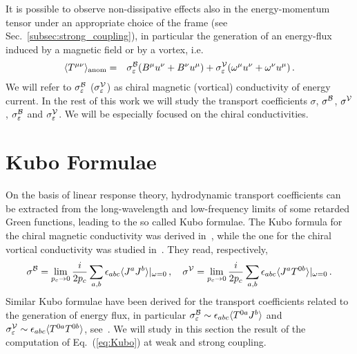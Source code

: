 \documentclass[a4paper]{jpconf}
\begin{document}
It is possible to observe non-dissipative effects also in the energy-momentum tensor under an appropriate choice of the frame (see Sec.~\ref{subsec:strong_coupling}), in particular the generation of an energy-flux induced by a magnetic field or by a vortex, i.e.
\begin{eqnarray}
\langle T^{\mu\nu} \rangle_{\textrm{\scriptsize anom}} &=& \sigma_{\varepsilon}^{{\cal B}} (B^\mu u^\nu + B^\nu u^\mu)  + \sigma_{\varepsilon}^{{\cal V}} (\omega^\mu u^\nu +  \omega^\nu u^\mu) \,. \label{eq:Tanom}
\end{eqnarray}
We will refer to $\sigma_{\varepsilon}^{{\cal B}}$ ($\sigma_{\varepsilon}^{{\cal V}}$) as chiral magnetic (vortical) conductivity of energy current. In the rest of this work we will study the transport coefficients $\sigma$, $\sigma^{\cal B}$, $\sigma^{\cal V}$, $\sigma_{\varepsilon}^{{\cal B}}$ and $\sigma_{\varepsilon}^{{\cal V}}$. We will be especially focused on the chiral conductivities.



\section{Kubo Formulae}
\label{sec:Kubo_Formulae}

On the basis of linear response theory, hydrodynamic transport coefficients can be extracted from the long-wavelength and low-frequency limits of some retarded Green functions, leading to the so called Kubo formulae. The Kubo formula for the chiral magnetic conductivity was derived in~\cite{Kharzeev:2009pj}, while the one for the chiral vortical conductivity was studied in~\cite{Amado:2011zx}. They read, respectively, 
\begin{equation}
\sigma^{\cal B} = \lim_{p_c\rightarrow 0} \frac{i}{2p_c} \sum_{a,b}\epsilon_{abc}
\langle J^a J^b \rangle|_{\omega=0}  \,,\quad \sigma^{\cal V}  = \lim_{p_c\rightarrow 0} \frac{i}{2p_c} \sum_{a,b}\epsilon_{abc}
\langle J^a T^{0b} \rangle|_{\omega=0} \,.  \label{eq:Kubo}
\end{equation}
Similar Kubo formulae have been derived for the transport coefficients related to the generation of energy flux, in particular $\sigma_{\varepsilon}^{{\cal B}} \sim \epsilon_{abc} \langle T^{0a} J^b \rangle$ and $\sigma_{\varepsilon}^{{\cal V}} \sim \epsilon_{abc} \langle T^{0a} T^{0b} \rangle$, see~\cite{Amado:2011zx,Landsteiner:2011iq,Landsteiner:2012kd,Chowdhury:2015pba}. We will study in this section the result of the computation of Eq.~(\ref{eq:Kubo}) at weak and strong coupling.
\end{document}
